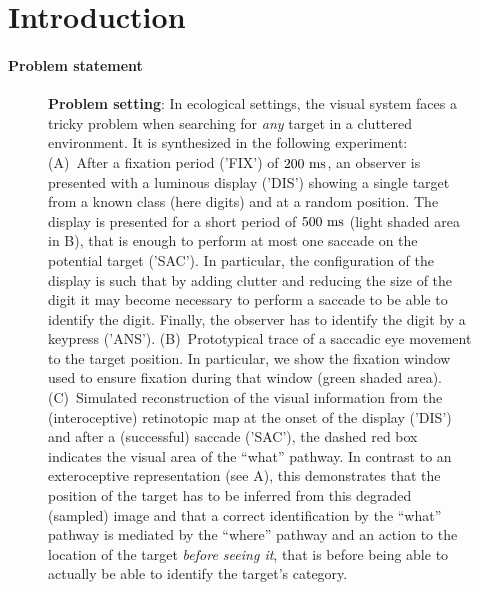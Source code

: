 \section{Introduction}
\label{sec:intro}
\paragraph{Problem statement}
\begin{figure}[b!]%
	\caption{%
		{\bf Problem setting}: In ecological settings, the visual system faces a tricky problem when searching for \emph{any} target in a cluttered environment. It is synthesized in the following experiment: %
		(A)~After a fixation period ('FIX') of $200~\si{\milli\second}$, an observer is presented with a luminous display ('DIS') showing a single target from a known class (here digits) and at a random position. The display is presented for a short period of $500~\si{\milli\second}$ (light shaded area in B), that is enough to perform at most one saccade on the potential target ('SAC'). In particular, the configuration of the display is such that by adding clutter and reducing the size of the digit it may become necessary to perform a saccade to be able to identify the digit.  Finally, the observer has to identify the digit by a keypress ('ANS'). %
		(B)~Prototypical trace of a saccadic eye movement to the target position. In particular, we show the fixation window used to ensure fixation during that window (green shaded area). %
		(C)~Simulated reconstruction of the visual information from the (interoceptive) retinotopic map at the onset of the display ('DIS') and after a (successful) saccade ('SAC'), the dashed red box indicates the visual area of the ``what'' pathway. In contrast to an exteroceptive representation (see A), this demonstrates that the position of the target has to be inferred from this degraded (sampled) image and that a correct identification by the ``what'' pathway is mediated by the ``where'' pathway and an action to the location of the target \emph{before seeing it}, that is before being able to actually be able to identify the target's category.%
		\label{fig:intro}}%
\end{figure}%

